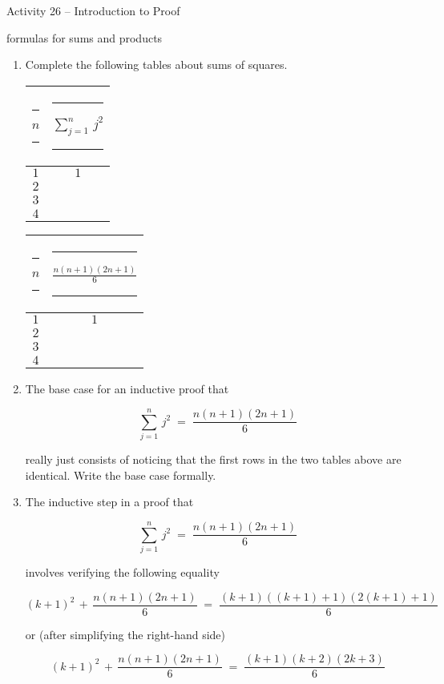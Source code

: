 \documentclass{amsart}
\newcommand{\hs}{\rule{18pt}{0pt}}
\newcommand{\vs}{\rule[-16pt]{0pt}{32pt}}
\begin{document}
\thispagestyle{empty}

\centerline{\Large Activity 26 -- Introduction to Proof}
\centerline{\large formulas for sums and products}

\bigskip
\Large


\begin{enumerate}
\item Complete the following tables about sums of squares.
\bigskip

\begin{tabular}{c|c}
\vs\hs $n$ \hs & \hs $\displaystyle \sum_{j=1}^n \, j^2$ \hs \\ \hline
\vs $1$ & $1$ \\
\vs $2$ & \\
\vs $3$ & \\
\vs $4$ & \\
\end{tabular}
\hspace{.5in}
\begin{tabular}{c|c}
\vs \hs $n$ \hs & \hs $\displaystyle \frac{n(n + 1)(2n + 1)}{6}$ \hs \\ \hline
\vs $1$ & $1$ \\
\vs $2$ & \\
\vs $3$ & \\
\vs $4$ & \\
\end{tabular}

\vspace{.3in}

\item The base case for an inductive proof that

\[ \sum_{j=1}^n \, j^2 \; = \; \frac{n(n + 1)(2n + 1)}{6}\]

really just consists of noticing that the first rows in the two tables
above are identical.  Write the base case formally.

\vfill

\newpage

\item The inductive step in a proof that

\[ \sum_{j=1}^n \, j^2 \; = \; \frac{n(n + 1)(2n + 1)}{6}\]

involves verifying the following equality

\[ (k + 1)^2 \, + \, \frac{n(n + 1)(2n + 1)}{6} \; = \; 
\frac{(k + 1)((k + 1) + 1)(2(k + 1) + 1)}{6}
\]

or (after simplifying the right-hand side)

\[ (k + 1)^2 \, + \, \frac{n(n + 1)(2n + 1)}{6} \; = \; 
\frac{(k + 1)(k + 2)(2k + 3)}{6}
\]


\end{enumerate}
\end{document}
